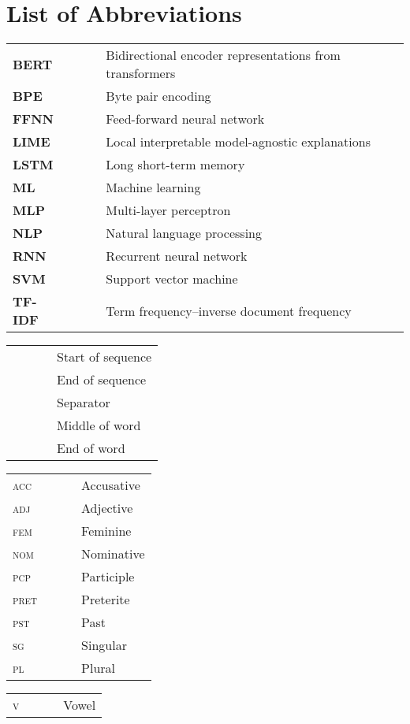 \tableofcontents
\linespread{1.25}
\newpage
\listoffigures
\listoftables

\newpage
\chapter*{List of Abbreviations}


\begin{tabular}{lcl}
\textbf{BERT} & ~~~ & Bidirectional encoder representations from transformers \\
\textbf{BPE} & ~~~ & Byte pair encoding \\
\textbf{FFNN} & ~~~ & Feed-forward neural network \\
\textbf{LIME} & ~~~ & Local interpretable model-agnostic explanations\\
\textbf{LSTM} & ~~~ & Long short-term memory \\
\textbf{ML} & ~~~ & Machine learning \\
\textbf{MLP} & ~~~ & Multi-layer perceptron \\
\textbf{NLP} & ~~~ & Natural language processing \\
\textbf{RNN} & ~~~ & Recurrent neural network \\
\textbf{SVM} & ~~~ & Support vector machine \\
\textbf{TF-IDF} & ~~~ & Term frequency--inverse document frequency\\
\end{tabular}


\begin{tabular}{lcl}
\ngram{\sos} & ~~~ & Start of sequence \\
\ngram{\eos} & ~~~ & End of sequence \\
\ngram{\sep} & ~~~ & Separator \\[5mm]
\ngram{\mow} & ~~~ & Middle of word \\
\ngram{\eow} & ~~~ & End of word \\
\end{tabular}

\newpage
{}

\begin{tabular}{lcl}
\textsc{acc} & ~~~ & Accusative \\
\textsc{adj} & ~~~ & Adjective \\
\textsc{fem} & ~~~ & Feminine \\
\textsc{nom} & ~~~ & Nominative \\
\textsc{pcp} & ~~~ & Participle \\
\textsc{pret} & ~~~ & Preterite \\
\textsc{pst} & ~~~ & Past \\
\textsc{sg} & ~~~ & Singular \\
\textsc{pl} & ~~~ & Plural \\
\end{tabular}


\begin{tabular}{lcl}
\textsc{v} & ~~~ & Vowel \\
\end{tabular}
